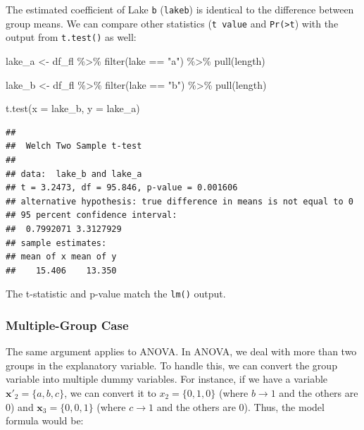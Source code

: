 \documentclass[
]{article}
\newenvironment{Shaded}{\begin{snugshade}}{\end{snugshade}}
\newcommand{\AttributeTok}[1]{\textcolor[rgb]{0.77,0.63,0.00}{#1}}
\newcommand{\FunctionTok}[1]{\textcolor[rgb]{0.00,0.00,0.00}{#1}}
\newcommand{\NormalTok}[1]{#1}
\newcommand{\OtherTok}[1]{\textcolor[rgb]{0.56,0.35,0.01}{#1}}
\newcommand{\SpecialCharTok}[1]{\textcolor[rgb]{0.00,0.00,0.00}{#1}}
\newcommand{\StringTok}[1]{\textcolor[rgb]{0.31,0.60,0.02}{#1}}
\begin{document}
The estimated coefficient of Lake \texttt{b} (\texttt{lakeb}) is identical to the difference between group means. We can compare other statistics (\texttt{t\ value} and \texttt{Pr(\textgreater{}\textbar{}t\textbar{}}) with the output from \texttt{t.test()} as well:

\begin{Shaded}
\begin{Highlighting}[]
\NormalTok{lake\_a }\OtherTok{\textless{}{-}}\NormalTok{ df\_fl }\SpecialCharTok{\%\textgreater{}\%} 
  \FunctionTok{filter}\NormalTok{(lake }\SpecialCharTok{==} \StringTok{"a"}\NormalTok{) }\SpecialCharTok{\%\textgreater{}\%} 
  \FunctionTok{pull}\NormalTok{(length)}

\NormalTok{lake\_b }\OtherTok{\textless{}{-}}\NormalTok{ df\_fl }\SpecialCharTok{\%\textgreater{}\%} 
  \FunctionTok{filter}\NormalTok{(lake }\SpecialCharTok{==} \StringTok{"b"}\NormalTok{) }\SpecialCharTok{\%\textgreater{}\%} 
  \FunctionTok{pull}\NormalTok{(length)}

\FunctionTok{t.test}\NormalTok{(}\AttributeTok{x =}\NormalTok{ lake\_b, }\AttributeTok{y =}\NormalTok{ lake\_a)}
\end{Highlighting}
\end{Shaded}

\begin{verbatim}
## 
##  Welch Two Sample t-test
## 
## data:  lake_b and lake_a
## t = 3.2473, df = 95.846, p-value = 0.001606
## alternative hypothesis: true difference in means is not equal to 0
## 95 percent confidence interval:
##  0.7992071 3.3127929
## sample estimates:
## mean of x mean of y 
##    15.406    13.350
\end{verbatim}

The t-statistic and p-value match the \texttt{lm()} output.

\hypertarget{multiple-group-case}{%
\subsubsection{Multiple-Group Case}\label{multiple-group-case}}

The same argument applies to ANOVA. In ANOVA, we deal with more than two groups in the explanatory variable. To handle this, we can convert the group variable into multiple dummy variables. For instance, if we have a variable \(\pmb{x'}_2 = \{a, b, c\}\), we can convert it to \(x_2 = \{0, 1, 0\}\) (where \(b \rightarrow 1\) and the others are \(0\)) and \(\pmb{x}_3 = \{0, 0, 1\}\) (where \(c \rightarrow 1\) and the others are \(0\)). Thus, the model formula would be:
\end{document}
